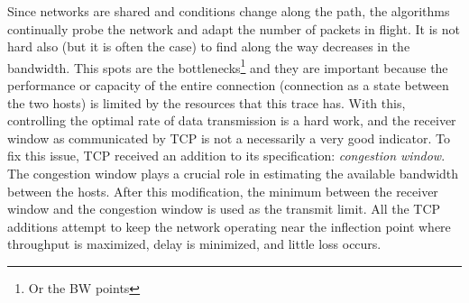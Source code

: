 Since networks are shared and conditions change along the path, the algorithms
continually probe the network and adapt the number of packets in flight. It is
not hard also (but it is often the case) to find along the way decreases in
the bandwidth. This spots are the bottlenecks\footnote{Or the \gls{BW}
points} and they are important because the performance or capacity of the
entire connection (connection as a state between the two hosts) is limited by
the resources that this trace has. With this, controlling the optimal rate of
data transmission is a hard work, and the receiver window as communicated by
TCP is not a necessarily a very good indicator. To fix this issue, TCP
received an addition to its specification: \textit{congestion window}. The
congestion window plays a crucial role in estimating the available bandwidth
between the hosts. After this modification, the minimum between the receiver
window and the congestion window is used as the transmit limit. All the TCP
additions attempt to keep the network operating near the inflection point
where throughput is maximized, delay is minimized, and little loss occurs.
